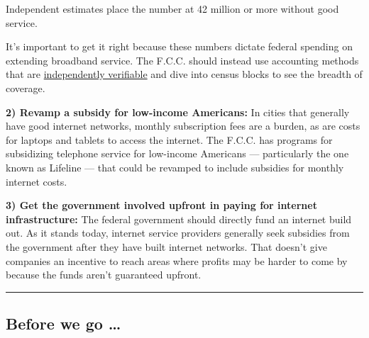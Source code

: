 Independent estimates place the number at 42 million or more without
good service.

It's important to get it right because these numbers dictate federal
spending on extending broadband service. The F.C.C. should instead use
accounting methods that are
\href{https://broadbandnow.com/research/fcc-underestimates-unserved-by-50-percent}{independently
verifiable} and dive into census blocks to see the breadth of coverage.

\textbf{2) Revamp a subsidy for low-income Americans:} In cities that
generally have good internet networks, monthly subscription fees are a
burden, as are costs for laptops and tablets to access the internet. The
F.C.C. has programs for subsidizing telephone service for low-income
Americans --- particularly the one known as Lifeline --- that could be
revamped to include subsidies for monthly internet costs.

\textbf{3) Get the government involved upfront in paying for internet
infrastructure:} The federal government should directly fund an internet
build out. As it stands today, internet service providers generally seek
subsidies from the government after they have built internet networks.
That doesn't give companies an incentive to reach areas where profits
may be harder to come by because the funds aren't guaranteed upfront.

\begin{center}\rule{0.5\linewidth}{\linethickness}\end{center}

\hypertarget{before-we-go-}{%
\subsection{Before we go \ldots{}}\label{before-we-go-}}

